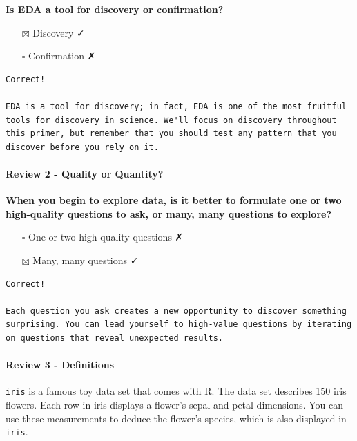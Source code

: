 \documentclass[
]{article}
\providecommand{\tightlist}{%
  \setlength{\itemsep}{0pt}\setlength{\parskip}{0pt}}
\begin{document}
\textbf{Is EDA a tool for discovery or confirmation?}

\begin{itemize}
\tightlist
\item[$\boxtimes$]
  Discovery ✓
\item[$\square$]
  Confirmation ✗
\end{itemize}

\begin{verbatim}
Correct!

EDA is a tool for discovery; in fact, EDA is one of the most fruitful tools for discovery in science. We'll focus on discovery throughout this primer, but remember that you should test any pattern that you discover before you rely on it.
\end{verbatim}

\hypertarget{review-2---quality-or-quantity}{%
\paragraph{Review 2 - Quality or
Quantity?}\label{review-2---quality-or-quantity}}

\textbf{When you begin to explore data, is it better to formulate one or
two high-quality questions to ask, or many, many questions to explore?}

\begin{itemize}
\tightlist
\item[$\square$]
  One or two high-quality questions ✗
\item[$\boxtimes$]
  Many, many questions ✓
\end{itemize}

\begin{verbatim}
Correct!

Each question you ask creates a new opportunity to discover something surprising. You can lead yourself to high-value questions by iterating on questions that reveal unexpected results.
\end{verbatim}

\hypertarget{review-3---definitions}{%
\paragraph{Review 3 - Definitions}\label{review-3---definitions}}

\texttt{iris} is a famous toy data set that comes with R. The data set
describes 150 iris flowers. Each row in iris displays a flower's sepal
and petal dimensions. You can use these measurements to deduce the
flower's species, which is also displayed in \texttt{iris}.
\end{document}
